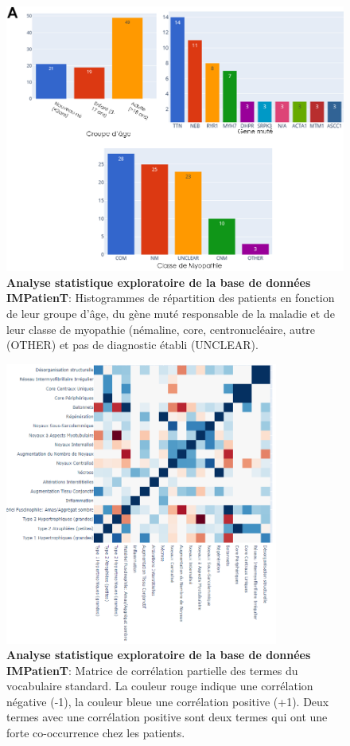 \begin{figure}[!htbp]
  \centering
  \includegraphics[width=1\textwidth]{figures/impatient_explo.png}
  \caption[Analyse statistique exploratoire IMPatienT (histogrammes)]{\textbf{Analyse statistique exploratoire de la base de données IMPatienT}: Histogrammes de répartition des patients en fonction de leur groupe d'âge, du gène muté responsable de la maladie et de leur classe de myopathie (némaline, core, centronucléaire, autre (OTHER) et pas de diagnostic établi (UNCLEAR).}
  \label{fig:impatient_eda}
\end{figure}
\begin{figure}[!htbp]
  \centering
  \includegraphics[width=0.8\textwidth]{figures/impatient_explo2.png}
  \caption[Analyse statistique exploratoire IMPatienT (matrice)]{\textbf{Analyse statistique exploratoire de la base de données IMPatienT}: Matrice de corrélation partielle des termes du vocabulaire standard. La couleur rouge indique une corrélation négative (-1), la couleur bleue une corrélation positive (+1). Deux termes avec une corrélation positive sont deux termes qui ont une forte co-occurrence chez les patients.}
  \label{fig:impatient_eda2}
\end{figure}

